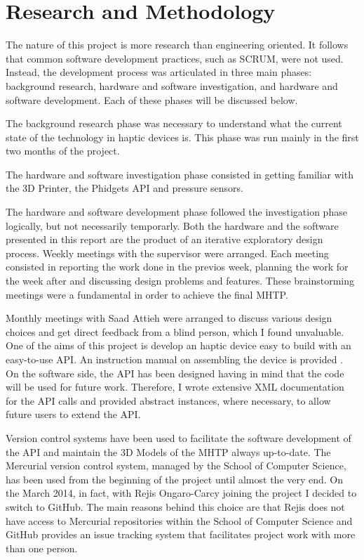\chapter{Research and Methodology}

The nature of this project is more research than engineering oriented. It follows that common software development practices, such as SCRUM, were not used. Instead, the development process was articulated in three main phases: background research, hardware and software investigation, and hardware and software development. Each of these phases will be discussed below. 

The background research phase was necessary to understand what the current state of the technology in haptic devices is. This phase was run mainly in the first two months of the project. 

The hardware and software investigation phase consisted in getting familiar with the 3D Printer, the Phidgets API and pressure sensors. 

The hardware and software development phase followed the investigation phase logically, but not necessarily temporarly. Both the hardware and the software presented in this report are the product of an iterative exploratory design process. Weekly meetings with the supervisor were arranged. Each meeting consisted in reporting the work done in the previos week, planning the work for the week after and discussing design problems and features. These brainstorming meetings were a fundamental in order to achieve the final MHTP.

Monthly meetings with Saad Attieh were arranged to discuss various design choices and get direct feedback from a blind person, which I found unvaluable. 
One of the aims of this project is develop an haptic device easy to build with an easy-to-use API. An instruction manual on assembling the device is provided . On the software side, the API has been designed having in mind that the code will be used for future work. Therefore, I wrote extensive XML documentation for the API calls and provided abstract instances, where necessary, to allow future users to extend the API. 

Version control systems have been used to facilitate the software development of the API and maintain the 3D Models of the MHTP always up-to-date. The Mercurial version control system, managed by the School of Computer Science, has been used from the beginning of the project until almost the very end. On the  March 2014, in fact, with Rejis Ongaro-Carcy joining the project I decided to switch to GitHub. The main reasons behind this choice are that Rejis does not have access to Mercurial repositories within the School of Computer Science and GitHub provides an issue tracking system that facilitates project work with more than one person.  

